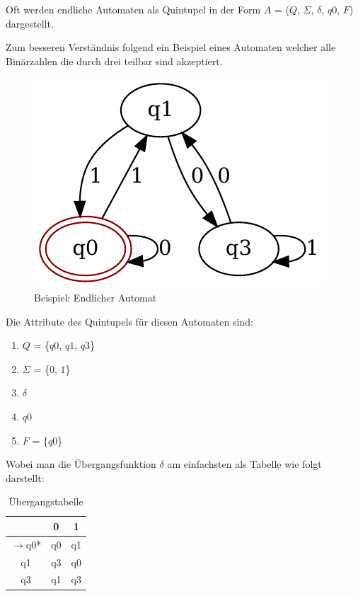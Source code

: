 Oft werden endliche Automaten als Quintupel in der Form $A$ = ($Q$, $\Sigma$, $\delta$, $q0$, $F$) dargestellt. 

Zum besseren Verständnis folgend ein Beispiel eines Automaten welcher alle Binärzahlen die durch drei teilbar sind akzeptiert.
\begin{figure}[h]
  \centering
  \includegraphics{images/endlicher_automat.pdf}
  \caption[Beispiel: Endlicher Automat]{Beispiel: Endlicher Automat}
  \label{fig:endlicher_automat}
\end{figure}

Die Attribute des Quintupels für diesen Automaten sind:
\begin{enumerate}
	\item $Q$ = \{$q0$, $q1$, $q3$\}
	\item $\Sigma$ = \{$0$, $1$\}
	\item $\delta$
	\item $q0$
	\item $F$ = \{$q0$\}
\end{enumerate}
Wobei man die Übergangsfunktion $\delta$ am einfachsten als Tabelle wie folgt darstellt:
\begin{table}[h]
	\centering
	\begin{tabular}{ c || c | c }
	  \hline
	   & 0 & 1 \\
	  \hline  
	  $\rightarrow$q0* & q0 & q1 \\
	  q1 & q3 & q0 \\
	  q3 & q1 & q3 \\
	  \hline  
	\end{tabular}
	\caption[Übergangstabelle]{Übergangstabelle}
\end{table}

